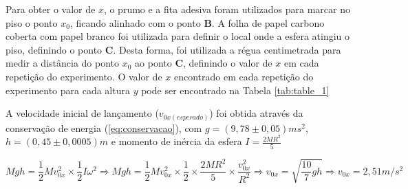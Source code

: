 \documentclass[10pt]{article}
\begin{document}
Para obter o valor de $x$, o prumo e a fita adesiva foram utilizados para marcar no piso o ponto $x_0$, ficando alinhado com o ponto \textbf{B}. A folha de papel carbono coberta com papel branco foi utilizada para definir o local onde a esfera atingiu o piso, definindo o ponto \textbf{C}. Desta forma, foi utilizada a régua centimetrada para medir a distância do ponto $x_0$ ao ponto \textbf{C}, definindo o valor de $x$ em cada repetição do experimento. O valor de $x$ encontrado em cada repetição do experimento para cada altura $y$ pode ser encontrado na Tabela \ref{tab:table_1}


\begin{table}[h!]
	\begin{center}
		\caption{Resultados obtidos em cada repetição do experimento}
		\label{tab:table_1}
	\end{center}
\end{table}

A velocidade inicial de lançamento ($v_{0x (esperado)}$) foi obtida através da conservação de energia (\ref{eq:conservacao}), com $g = (9,78 \pm 0,05) ms^2$, $h = (0,45 \pm 0,0005)m$ e momento de inércia da esfera $I = \frac{2MR^2}{5}$


\begin{equation}
Mgh = \frac{1}{2}Mv_{0x}^2 \times \frac{1}{2}I\omega^2 \Rightarrow
Mgh = \frac{1}{2}Mv_{0x}^2 \times \frac{1}{2} \times \frac{2MR^2}{5}  \times \frac{v_{0x}^2}{R^2} \Rightarrow
v_{0x} = \sqrt{\frac{10}{7}gh} \Rightarrow v_{0x} = 2,51 m/s^2
\label{eq:conservacao}
\end{equation}
\end{document}
